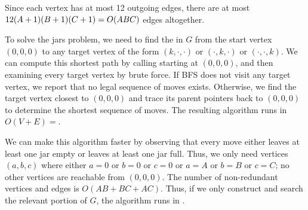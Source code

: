 \documentclass[11pt]{article}
\begin{document}
\begin{enumerate}
\begin{solution}
\begin{itemize}
Since each vertex has at most 12 outgoing edges, there are at most $12(A+1)\*(B+1)(C+1) = O(ABC)$ edges altogether.
\end{itemize}

To solve the jars problem, we need to find the  in $G$ from the start vertex $(0,0,0)$ to any target vertex of the form $(k, \cdot, \cdot)$ or $(\cdot, k, \cdot)$ or $(\cdot,\cdot, k)$.  We can compute this shortest path by calling  starting at $(0,0,0)$, and then examining every target vertex by brute force.  If BFS does not visit any target vertex, we report that no legal sequence of moves exists.  Otherwise, we find the target vertex closest to $(0,0,0)$ and trace its parent pointers back to $(0,0,0)$ to determine the shortest sequence of moves.  The resulting algorithm runs in $O(V+E) ={}$.

We can make this algorithm faster by observing that every move either leaves at least one jar empty or leaves at least one jar full.  Thus, we only need vertices $(a,b,c)$ where either $a=0$ or $b=0$ or $c=0$ or $a=A$ or $b=B$ or $c=C$; no other vertices are reachable from $(0,0,0)$.  The number of non-redundant vertices and edges is $O(AB+BC+AC)$.  Thus, if we only construct and search the relevant portion of $G$, the algorithm runs in .
\end{solution}


\end{enumerate}
\end{document}
